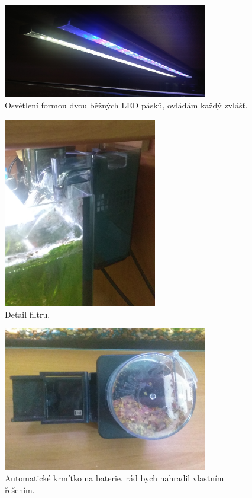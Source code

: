 \documentclass{customarticle}
\begin{document}
	\begin{figure}[!h]
		\centering
		\includegraphics[width=0.8\textwidth]{svetla.jpg}
		\caption{Osvětlení formou dvou běžných LED pásků, ovládám každý zvlášť.}
		\label{fig:svetla}
	\end{figure}
	
	\begin{figure}[!h]
		\centering
		\includegraphics[width=0.6\textwidth]{filtr.jpg}
		\caption{Detail filtru.}
		\label{fig:filtr}
	\end{figure}

	\begin{figure}[!h]
		\centering
		\includegraphics[width=0.8\textwidth]{krmitko.jpg}
		\caption{Automatické krmítko na baterie, rád bych nahradil vlastním řešením.}
		\label{fig:krmitko}
	\end{figure}
\end{document}
